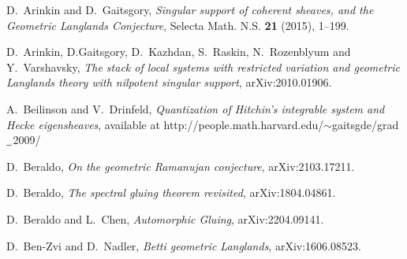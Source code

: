 \documentclass[9pt]{amsart}
\theoremstyle{remark}
\theoremstyle{definition}
\theoremstyle{remark}
\numberwithin{equation}{section}
\begin{document}
\begin{thebibliography}{99}


 D.~Arinkin and D.~Gaitsgory, {\it Singular support of coherent sheaves, and the Geometric Langlands Conjecture}, 
Selecta Math. N.S. {\bf 21} (2015), 1--199.

 D.~Arinkin, D.Gaitsgory, D.~Kazhdan, S.~Raskin, N.~Rozenblyum and Y.~Varshavsky, \newline
{\em The stack of local systems with restricted variation and geometric Langlands theory with nilpotent singular support},
arXiv:2010.01906. 

 A.~Beilinson and V.~Drinfeld, {\it Quantization of Hitchin's integrable system and Hecke eigensheaves}, 
available at http://people.math.harvard.edu/$\sim$gaitsgde/grad$\underline{\text{\,\,\,}}$2009/



 D.~Beraldo, {\it On the geometric Ramanujan conjecture}, arXiv:2103.17211.

 D.~Beraldo, {\it The spectral gluing theorem revisited}, arXiv:1804.04861.

 D.~Beraldo and L.~Chen, {\it Automorphic Gluing}, 
arXiv:2204.09141.

 D.~Ben-Zvi and D.~Nadler, {\it Betti geometric Langlands}, arXiv:1606.08523.







\end{thebibliography}
\end{document}
